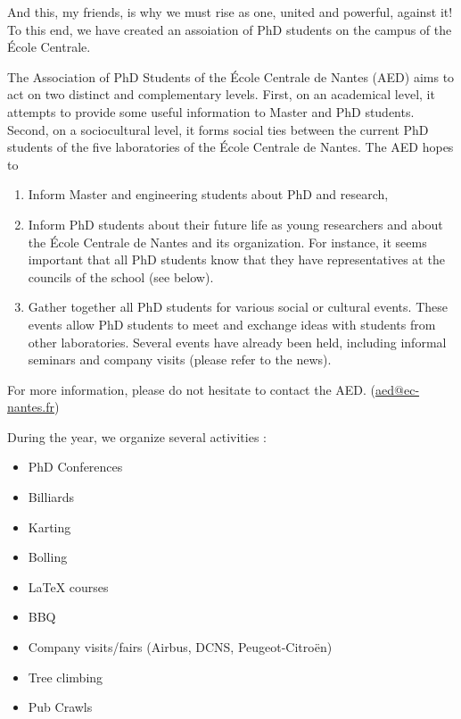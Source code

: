 \documentclass[12pt, english, squeezeCommittee, fancyChapter, fancyPart]{these-LUNAM}
\begin{document}
And this, my friends, is why we must rise as one, united and powerful, against it! To this end, we have created an assoiation of PhD students on the campus of the École Centrale.

The Association of PhD Students of the École Centrale de Nantes (AED) aims to act on two distinct and complementary levels. First, on an academical level, it attempts to provide some useful information to Master and PhD students. Second, on a sociocultural level, it forms social ties between the current PhD students of the five laboratories of the École Centrale de Nantes. The AED hopes to
\begin{enumerate}
    \item Inform Master and engineering students about PhD and research,
    \item Inform PhD students about their future life as young researchers and about the École Centrale de Nantes and its organization. For instance, it seems important that all PhD students know that they have representatives at the councils of the school (see below).
    \item Gather together all PhD students for various social or cultural events. These events allow PhD students to meet and exchange ideas with students from other laboratories. Several events have already been held, including informal seminars and company visits (please refer to the news).
\end{enumerate}

For more information, please do not hesitate to contact the AED. (\url{aed@ec-nantes.fr})


During the year, we organize several activities :
\begin{itemize}
    \item PhD Conferences
    \item Billiards
    \item Karting
    \item Bolling
    \item \LaTeX{} courses
    \item BBQ
    \item Company visits/fairs (Airbus, DCNS, Peugeot-Citroën)
    \item Tree climbing
    \item Pub Crawls
\end{itemize}
\mainmatter



%


\end{document}
